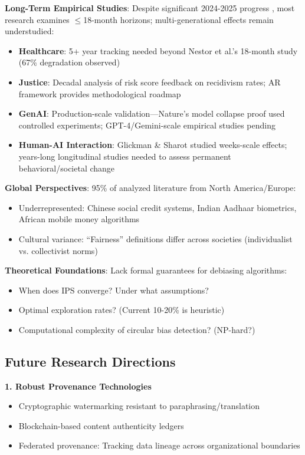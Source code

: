 \documentclass[11pt,a4paper]{article}
\begin{document}
\textbf{Long-Term Empirical Studies}:
Despite significant 2024-2025 progress \cite{shumailov2024,ren2024,glickman2024,nestor2024}, most research examines $\leq$18-month horizons; multi-generational effects remain understudied:
\begin{itemize}
    \item \textbf{Healthcare}: 5+ year tracking needed beyond Nestor et al.'s \cite{nestor2024} 18-month study (67\% degradation observed)
    \item \textbf{Justice}: Decadal analysis of risk score feedback on recidivism rates; AR framework \cite{wyllie2024} provides methodological roadmap
    \item \textbf{GenAI}: Production-scale validation—Nature's model collapse proof \cite{shumailov2024} used controlled experiments; GPT-4/Gemini-scale empirical studies pending
    \item \textbf{Human-AI Interaction}: Glickman \& Sharot \cite{glickman2024} studied weeks-scale effects; years-long longitudinal studies needed to assess permanent behavioral/societal change
\end{itemize}

\textbf{Global Perspectives}:  
95\% of analyzed literature from North America/Europe:
\begin{itemize}
    \item Underrepresented: Chinese social credit systems, Indian Aadhaar biometrics, African mobile money algorithms  
    \item Cultural variance: ``Fairness'' definitions differ across societies (individualist vs. collectivist norms)
\end{itemize}

\textbf{Theoretical Foundations}:  
Lack formal guarantees for debiasing algorithms:
\begin{itemize}
    \item When does IPS converge? Under what assumptions?  
    \item Optimal exploration rates? (Current 10-20\% is heuristic)  
    \item Computational complexity of circular bias detection? (NP-hard?)
\end{itemize}

\subsection{Future Research Directions}

\textbf{1. Robust Provenance Technologies}  
\begin{itemize}
    \item Cryptographic watermarking resistant to paraphrasing/translation  
    \item Blockchain-based content authenticity ledgers  
    \item Federated provenance: Tracking data lineage across organizational boundaries
\end{itemize}
\end{document}
